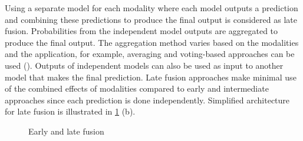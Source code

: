 Using a separate model for each modality where each model outputs a prediction and combining these predictions to produce the final output is considered as late fusion. Probabilities from the independent model outputs are aggregated to produce the final output. The aggregation method varies based on the modalities and the application, for example, averaging and voting-based approaches can be used (\cite{article22}). Outputs of independent models can also be used as input to another model that makes the final prediction. Late fusion approaches make minimal use of the combined effects of modalities compared to early and intermediate approaches since each prediction is done independently. Simplified architecture for late fusion is illustrated in \ref{fig:early_late} (b).

\begin{figure}
\hfill
{}
\hfill
\label{fig:early}
\hfill
\label{fig:late}
\caption{Early and late fusion}
\label{fig:early_late}
\end{figure}

